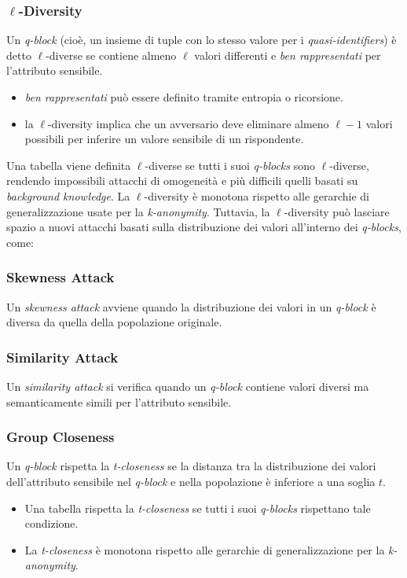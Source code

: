 \documentclass{report}
\begin{document}
\subsubsection{\texorpdfstring{$\ell$}{l}-Diversity}
Un \textit{q-block} (cioè, un insieme di tuple con lo stesso valore per i \textit{quasi-identifiers}) è detto $\ell$-diverse se contiene almeno $\ell$ valori differenti e \textit{ben rappresentati} per l'attributo sensibile. 
\begin{itemize}
    \item \textit{ben rappresentati} può essere definito tramite entropia o ricorsione. 
    \item la $\ell$-diversity implica che un avversario deve eliminare almeno $\ell-1$ valori possibili per inferire un valore sensibile di un rispondente.
\end{itemize}

\noindent Una tabella viene definita $\ell$-diverse se tutti i suoi \textit{q-blocks} sono $\ell$-diverse, rendendo impossibili attacchi di omogeneità e più difficili quelli basati su \textit{background knowledge}. 
La $\ell$-diversity è monotona rispetto alle gerarchie di generalizzazione usate per la \textit{k-anonymity}. 
Tuttavia, la $\ell$-diversity può lasciare spazio a nuovi attacchi basati sulla distribuzione dei valori all'interno dei \textit{q-blocks}, come:

\subsubsection{Skewness Attack}
Un \textit{skewness attack} avviene quando la distribuzione dei valori in un \textit{q-block} è diversa da quella della popolazione originale.

\subsubsection{Similarity Attack}
Un \textit{similarity attack} si verifica quando un \textit{q-block} contiene valori diversi ma semanticamente simili per l'attributo sensibile.

\subsubsection{Group Closeness}
Un \textit{q-block} rispetta la \textit{t-closeness} se la distanza tra la distribuzione dei valori dell'attributo sensibile nel \textit{q-block} e nella popolazione è inferiore a una soglia $t$.
\begin{itemize}
    \item Una tabella rispetta la \textit{t-closeness} se tutti i suoi \textit{q-blocks} rispettano tale condizione.
    \item La \textit{t-closeness} è monotona rispetto alle gerarchie di generalizzazione per la \textit{k-anonymity}.
\end{itemize}
\end{document}
